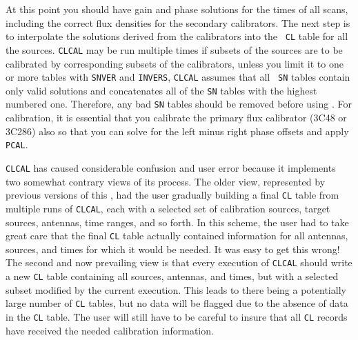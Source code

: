 
     At this point you should have gain and phase solutions for the
times of all  scans, including the correct flux
densities for the secondary calibrators.  The next step is to
interpolate the solutions derived from the calibrators into the {\tt
CL} table for all the sources.  {\tt CLCAL} may be run multiple times
if subsets of the sources are to be calibrated by corresponding
subsets of the calibrators, unless you limit it to one or more tables
with {\tt SNVER} and {\tt INVERS}, {\tt CLCAL} assumes that all {\tt
SN} tables contain only valid solutions and concatenates all of the
{\tt SN} tables with the highest numbered one.  Therefore, any bad
{\tt SN} tables should be removed before using {\tt {}}\@.
For  calibration, it is essential that you
calibrate the primary flux calibrator (3C48 or 3C286) also so that you
can solve for the left minus right phase offsets and apply {\tt
PCAL}\@.

     {\tt CLCAL} has caused considerable confusion and user error
because it implements two somewhat contrary views of its process.  The
older view, represented by previous versions of this \Cookbook, had
the user gradually building a final {\tt CL} table from multiple runs
of {\tt CLCAL}, each with a selected set of calibration sources,
target sources, antennas, time ranges, and so forth.  In this scheme,
the user had to take great care that the final {\tt CL} table actually
contained information for all antennas, sources, and times for which
it would be needed.  It was easy to get this wrong!  The second and
now prevailing view is that every execution of {\tt CLCAL} should
write a new {\tt CL} table containing all sources, antennas, and
times, but with a selected subset modified by the current execution.
This leads to there being a potentially large number of {\tt CL}
tables, but no data will be flagged due to the absence of data in the
{\tt CL} table.  The user will still have to be careful to insure that
all {\tt CL} records have received the needed calibration information.

